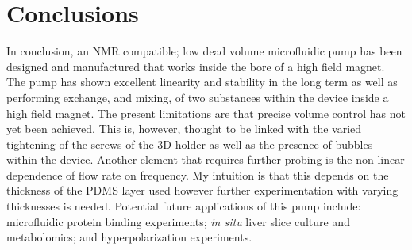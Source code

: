 \section{Conclusions}

In conclusion, an NMR compatible; low dead volume microfluidic pump has been designed and
manufactured that works inside the bore of a high field magnet. The pump has shown
excellent linearity and stability in the long term as well as performing exchange, and
mixing, of two substances within the device inside a high field magnet. The present limitations
are that precise volume control has not yet been achieved. This is, however, thought to be linked
with the varied tightening of the screws of the 3D holder as well as the presence of bubbles
within the device. Another element that requires further probing is the non-linear dependence of
flow rate on frequency. My intuition is that this depends on the thickness of the PDMS layer
used
however further experimentation with varying thicknesses is needed. Potential future
applications
of this pump include: microfluidic protein binding experiments; \textit{in situ} liver slice
culture and metabolomics; and hyperpolarization experiments.
